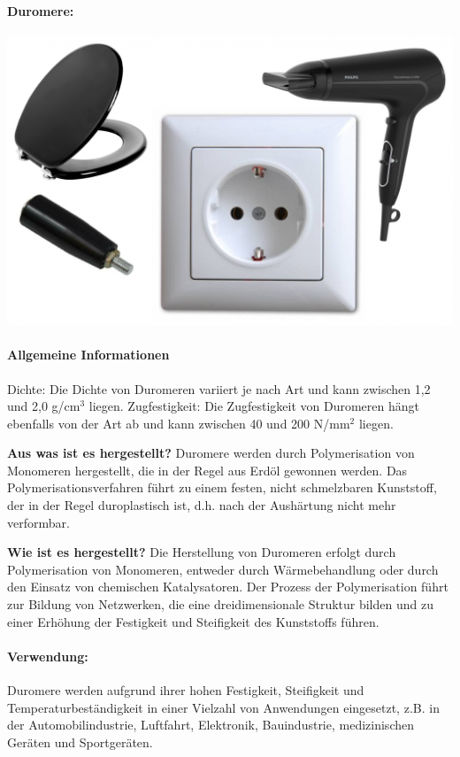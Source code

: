 \documentclass{article}
\begin{document}
\begin{multicols}{3}

\paragraph{Duromere:}
\includegraphics[width=\linewidth]{duroplaste.png}
\paragraph{Allgemeine Informationen}
Dichte: Die Dichte von Duromeren variiert je nach Art und kann zwischen 1,2 und
2,0 g/cm$^3$ liegen.
Zugfestigkeit: Die Zugfestigkeit von Duromeren hängt ebenfalls von der Art ab
und kann zwischen 40 und 200 N/mm$^2$ liegen.

\textbf{Aus was ist es hergestellt?}
Duromere werden durch Polymerisation von Monomeren hergestellt, die in der
Regel aus Erdöl gewonnen werden. Das Polymerisationsverfahren führt zu einem
festen, nicht schmelzbaren Kunststoff, der in der Regel duroplastisch ist, d.h.
nach der Aushärtung nicht mehr verformbar.

\textbf{Wie ist es hergestellt?}
Die Herstellung von Duromeren erfolgt durch Polymerisation von Monomeren,
entweder durch Wärmebehandlung oder durch den Einsatz von chemischen
Katalysatoren. Der Prozess der Polymerisation führt zur Bildung von Netzwerken,
die eine dreidimensionale Struktur bilden und zu einer Erhöhung der Festigkeit
und Steifigkeit des Kunststoffs führen.

\paragraph{Verwendung:}
Duromere werden aufgrund ihrer hohen Festigkeit, Steifigkeit und
Temperaturbeständigkeit in einer Vielzahl von Anwendungen eingesetzt, z.B. in
der Automobilindustrie, Luftfahrt, Elektronik, Bauindustrie, medizinischen
Geräten und Sportgeräten.


\end{multicols}
\end{document}
